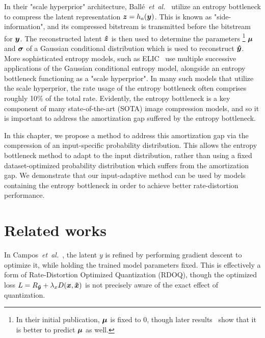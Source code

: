 In their "scale hyperprior" architecture, Ballé~\emph{et~al.}~\cite{balle2018variational} utilize an entropy bottleneck to compress the latent representation ${\boldsymbol{z}} = h_a({\boldsymbol{y}})$.
This is known as "side-information", and its compressed bitstream is transmitted before the bitstream for ${\boldsymbol{y}}$.
The reconstructed latent ${\boldsymbol{\hat{z}}}$ is then used to determine the parameters%
\footnote{In their initial publication, ${\boldsymbol{\mu}}$ is fixed to $0$, though later results~\cite{minnen2018joint} show that it is better to predict ${\boldsymbol{\mu}}$ as well.}
${\boldsymbol{\mu}}$ and ${\boldsymbol{\sigma}}$ of a Gaussian conditional distribution which is used to reconstruct ${\boldsymbol{\hat{y}}}$.
More sophisticated entropy models, such as ELIC~\cite{he2022elic} use multiple successive applications of the Gaussian conditional entropy model, alongside an entropy bottleneck functioning as a "scale hyperprior".
In many such models that utilize the scale hyperprior, the rate usage of the entropy bottleneck often comprises roughly 10\% of the total rate.
Evidently, the entropy bottleneck is a key component of many state-of-the-art (SOTA) image compression models, and so it is important to address the amortization gap suffered by the entropy bottleneck.

In this chapter, we propose a method to address this amortization gap via the compression of an input-specific probability distribution. %
This allows the entropy bottleneck method to adapt to the input distribution, rather than using a fixed dataset-optimized probability distribution which suffers from the amortization gap.
We demonstrate that our input-adaptive method can be used by models containing the entropy bottleneck in order to achieve better rate-distortion performance.




\section{Related works}
\label{sec:pdf_compression/related}

In Campos~\emph{et~al.}~\cite{campos2019content}, the latent $y$ is refined by performing gradient descent to optimize it, while holding the trained model parameters fixed.
This is effectively a form of Rate-Distortion Optimized Quantization (RDOQ), though the optimized loss
$L = R_{{\boldsymbol{\tilde{y}}}} + \lambda_x D({\boldsymbol{x}}, {\boldsymbol{\tilde{x}}})$
is not precisely aware of the exact effect of quantization.  %

